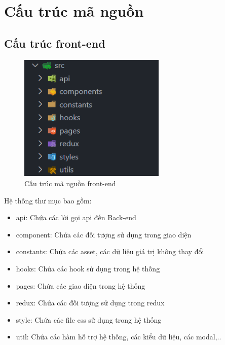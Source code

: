 \section{Cấu trúc mã nguồn}
\subsection{Cấu trúc front-end}
\begin{figure}[!htp]
    \begin{center}
        \includegraphics[width=7cm]{img/file-structure/front-end.png}
    \end{center}
    \caption{Cấu trúc mã nguồn front-end}
\end{figure}

Hệ thống thư mục bao gồm:
\begin{itemize}
    \item api: Chứa các lời gọi api đến Back-end
    \item component: Chứa các đối tượng sử dụng trong giao diện
    \item constants: Chứa các asset, các dữ liệu giá trị không thay đổi
    \item hooks: Chứa các hook sử dụng trong hệ thống
    \item pages: Chứa các giao diện trong hệ thống
    \item redux: Chứa các đối tượng sử dụng trong redux
    \item style: Chứa các file css sử dụng trong hệ thống
    \item util: Chứa các hàm hỗ trợ hệ thống, các kiểu dữ liệu, các modal,..
\end{itemize}


\newpage

